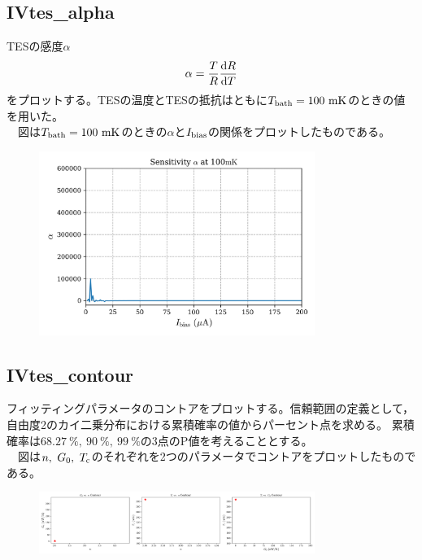 \documentclass[platex,dvipdfmx,10pt,twoside,a4paper,jis2004]{jsarticle}
\begin{document}
\subsection*{IVtes\_alpha}
TESの感度$\alpha$
\[
\alpha = \frac{T}{R}\frac{{\rm d}R}{{\rm d}T}
\]
をプロットする。TESの温度とTESの抵抗はともに$T_{\rm bath}=100\ {\rm mK}$のときの値を用いた。
\\　図は$T_{\rm bath}=100\ {\rm mK}$のときの$\alpha$と$I_{\rm bias}$の関係をプロットしたものである。
\begin{figure}[H]
    \centering
    \includegraphics[width=0.8\textwidth]{IVtes_alpha.png}
    \label{fig:IVtesalpha}
\end{figure}
\clearpage

\subsection*{IVtes\_contour}
フィッティングパラメータのコントアをプロットする。信頼範囲の定義として，自由度2のカイ二乗分布における累積確率の値からパーセント点を求める。
累積確率は$68.27\ \%,\ 90\ \%,\ 99\ \%$の3点のP値を考えることとする。\\　図は$n,\ G_0,\ T_{\rm c}$のそれぞれを2つのパラメータでコントアをプロットしたものである。
\begin{figure}[H]
    \centering
    \includegraphics[width=0.8\textwidth]{IVtes_contour.png}
    \label{fig:IVtescontour}
\end{figure}
\end{document}
